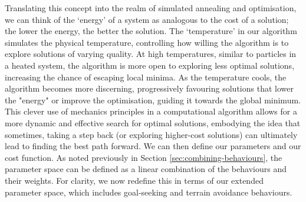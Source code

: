 \documentclass[12pt]{article}
\begin{document}
Translating this concept into the realm of simulated annealing and optimisation, we can think of the `energy' of a system as analogous to the cost of a solution; the lower the energy, the better the solution. The `temperature' in our algorithm simulates the physical temperature, controlling how willing the algorithm is to explore solutions of varying quality. At high temperatures, similar to particles in a heated system, the algorithm is more open to exploring less optimal solutions, increasing the chance of escaping local minima. As the temperature cools, the algorithm becomes more discerning, progressively favouring solutions that lower the "energy" or improve the optimisation, guiding it towards the global minimum. This clever use of mechanics principles in a computational algorithm allows for a more dynamic and effective search for optimal solutions, embodying the idea that sometimes, taking a step back (or exploring higher-cost solutions) can ultimately lead to finding the best path forward. We can then define our parameters and our cost function. As noted previously in Section \ref{sec:combining-behaviours}, the parameter space can be defined as a linear combination of the behaviours and their weights. For clarity, we now redefine this in terms of our extended parameter space, which includes goal-seeking and terrain avoidance behaviours.
\end{document}
